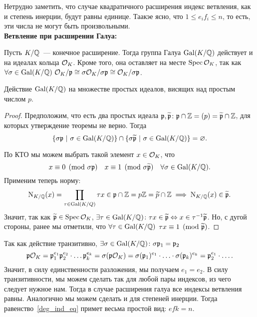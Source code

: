 	Нетрудно заметить, что случае квадратичного расширения индекс ветвления, как и степень инерции, будут равны единице.  Таакэе ясно, что $1 \le e_{i} f_{i} \le n$, то есть, эти числа не могут быть произвольными. \\

	\noindent\bf{Ветвление при расширении Галуа:}

	Пусть $K/\mathbb{Q}$~--- конечное расширение. Тогда группа Галуа $\operatorname{Gal}(K/\mathbb{Q})$ действует и на идеалах кольца $\mathcal{O}_{K}$. Кроме того, она оставляет на месте $\operatorname{Spec}{\mathcal{O}_{K}}$, так как $ \forall \sigma \in \operatorname{Gal}(K/\mathbb{Q}) \ \mathcal{O}_{K}/\mathfrak{p} \cong \sigma\mathcal{O}_{K}/\sigma \mathfrak{p} \cong \mathcal{O}_{K}/\sigma \mathfrak{p}$. 

	\begin{theorem} 
		Действие $\operatorname{Gal}(K/\mathbb{Q})$ на множестве простых идеалов, висящих над простым числом $p$.
	\end{theorem}
	\begin{proof}
		Предположим, что есть два простых идеала $\mathfrak{p}, \widetilde{\mathfrak{p}}\colon \mathfrak{p} \cap \mathbb{Z} = (p) = \widetilde{\mathfrak{p}} \cap \mathbb{Z}$, для которых утверждение теоремы не верно.  Тогда 
		\[
			\{ \sigma \mathfrak{p} \ \vert \ \sigma \in \operatorname{Gal}(K/\mathbb{Q}) \} \cap \{ \sigma \widetilde{\mathfrak{p}} \ \vert \ \sigma \in \operatorname{Gal}(K / \mathbb{Q}) \} = \varnothing.
		\]

		По КТО мы можем выбрать такой элемент $x \in \mathcal{O}_{K}$, что 
		\[
			x \equiv 0 \pmod{\sigma \mathfrak{p}} \quad x \equiv 1 \pmod{\sigma \widetilde{\mathfrak{p}}} \quad \forall \sigma \in \operatorname{Gal}(K/\mathbb{Q}).			
		\]
		Применим теперь норму: 
		\[
			\operatorname{\mathrm{N}}_{K/\mathbb{Q}}(x) = \prod_{\tau \in \operatorname{Gal}(K/Q)}\tau x \in \mathfrak{p} \cap \mathbb{Z} = p\mathbb{Z} = \widetilde{p} \cap \mathbb{Z} \implies \operatorname{\mathrm{N}}_{K/\mathbb{Q}}(x) \in \widetilde{\mathfrak{p}}. 
		\]
		Значит, так как $\widetilde{\mathfrak{p}} \in \operatorname{Spec}{\mathcal{O}_{K}}$, $\exists \tau \in \operatorname{Gal}(K/\mathbb{Q})\colon \tau x \in \widetilde{\mathfrak{p}} \Leftrightarrow x \in \tau^{-1}\widetilde{\mathfrak{p}}$. Но, с дугой стороны, ранее мы отметили, что $\forall \tau \in \operatorname{Gal}(K/\mathbb{Q})$ $\tau x \equiv 1 \pmod{\widetilde{\mathfrak{p}}}$.
	\end{proof}


	Так как действие транзитивно, $\exists \sigma \in \operatorname{Gal}(K/\mathbb{Q}) \colon \sigma\mathfrak{p}_{1} = \mathfrak{p}_{2}$
	\[
		\mathfrak{p} \mathcal{O}_{K} = \mathfrak{p}_{1}^{e_1} \mathfrak{p}_{2}^{e_2} \cdot \ldots \mathfrak{p}_{k}^{e_k} = \sigma(\mathfrak{p} \mathcal{O}_{K}) = \sigma(\mathfrak{p}_{1})^{e_1} \cdot \ldots \cdot \sigma(\mathfrak{p}_{k})^{e_k} = \mathfrak{p}_{2}^{e_{1}} \cdot \ldots. 
	\]
	Значит, в силу единственности разложения, мы получаем $e_{1} = e_{2}$. В силу транзитивности, мы можем сделать так для любой пары индексов, из чего следует нужное нам. Тогда в случае расширения галуа все индексы ветвления равны. Аналогично мы можем сделать и для степеней инерции. Тогда равенство~\eqref{deg_ind_eq} примет весьма простой вид: $e f k = n$.\\



